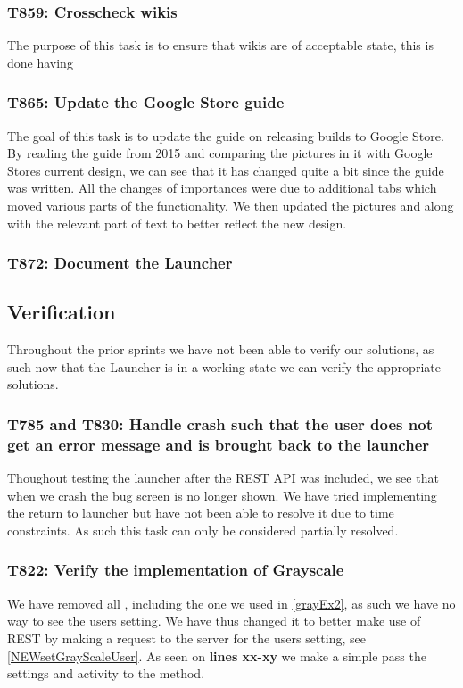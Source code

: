 \subsubsection{T859: Crosscheck wikis}
The purpose of this task is to ensure that wikis are of acceptable state, this
is done having

\subsubsection{T865: Update the Google Store guide}

The goal of this task is to update the guide on releasing builds to Google
Store. By reading the guide from 2015 and comparing the pictures in it with
Google Stores current design, we can see that it has changed quite a bit since
the guide was written. All the changes of importances were due to additional
tabs which moved various parts of the functionality. We then updated the
pictures and along with the relevant part of text to better reflect the new
design.

\subsubsection{T872: Document the Launcher}



\subsection{Verification}
Throughout the prior sprints we have not been able to verify our solutions, as
such now that the Launcher is in a working state we can verify the appropriate
solutions.

\subsubsection{T785 and T830: Handle crash such that the user does not get an
error message and is brought back to the launcher}
Thoughout testing the launcher after the REST API was included, we see that when
we crash the bug screen is no longer shown. We have tried implementing the
return to launcher but have not been able to resolve it due to time constraints.
As such this task can only be considered partially resolved.

\subsubsection{T822: Verify the implementation of Grayscale}
We have removed all , including the one we used in
\autoref{grayEx2}, as such we have no way to see the users setting. We have thus
changed it to better make use of REST by making a request to the server for the
users setting, see \autoref{NEWsetGrayScaleUser}. As seen on \textbf{lines
xx-xy} we make a simple  pass the settings and activity to the
 method.\nl

